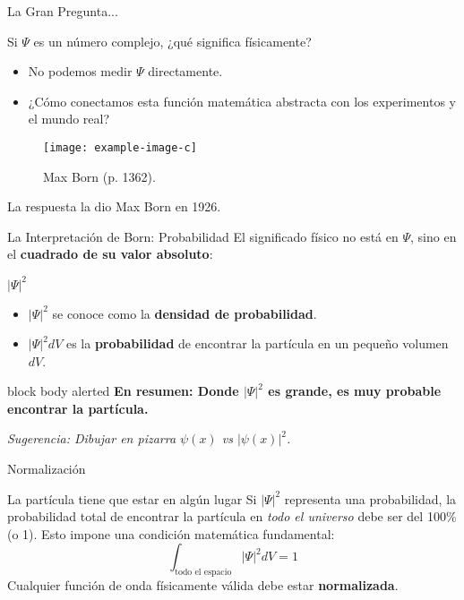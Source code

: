 \documentclass{beamer}
\begin{document}
\begin{frame}{La Gran Pregunta...}
  \begin{alertblock}{Si $\Psi$ es un número complejo, ¿qué significa físicamente?}
    \begin{itemize}
        \item No podemos medir $\Psi$ directamente.
        \item ¿Cómo conectamos esta función matemática abstracta con los experimentos y el mundo real?
    \end{itemize}
  \end{alertblock}
  \begin{figure}
    \centering
    \texttt{[image: example-image-c]} %
    \caption{Max Born (p. 1362).}
  \end{figure}
  \centering La respuesta la dio Max Born en 1926.
\end{frame}

\begin{frame}{La Interpretación de Born: Probabilidad}
  El significado físico no está en $\Psi$, sino en el \textbf{cuadrado de su valor absoluto}:
  \begin{center}
    \Huge $|\Psi|^2$
  \end{center}
  \begin{itemize}
    \item $|\Psi|^2$ se conoce como la \textbf{densidad de probabilidad}.
    \item $|\Psi|^2 dV$ es la \textbf{probabilidad} de encontrar la partícula en un pequeño volumen $dV$.
  \end{itemize}
  \vspace{1em}
  \begin{beamercolorbox}[sep=0.3cm,center,wd=\textwidth]{block body alerted}
    \textbf{En resumen: Donde $|\Psi|^2$ es grande, es muy probable encontrar la partícula.}
  \end{beamercolorbox}
  \tiny{\textit{Sugerencia: Dibujar en pizarra $\psi(x)$ vs $|\psi(x)|^2$.}}
\end{frame}

\begin{frame}{Normalización}
  \begin{block}{La partícula tiene que estar en algún lugar}
    Si $|\Psi|^2$ representa una probabilidad, la probabilidad total de encontrar la partícula en \textit{todo el universo} debe ser del 100\% (o 1).
    \vspace{0.5em}
    Esto impone una condición matemática fundamental:
    \begin{equation*}
      \int_{\text{todo el espacio}} |\Psi|^2 dV = 1
    \end{equation*}
    Cualquier función de onda físicamente válida debe estar \textbf{normalizada}.
  \end{block}
\end{frame}
\end{document}
